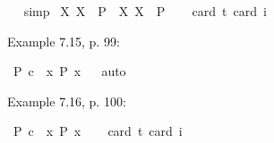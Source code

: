 \begin{isabellebody}
\ %
%
\isamarkupfalse%
\ simp%
%
%
\isanewline
{}\isamarkupfalse%
\ {\isachardoublequoteopen}{\isasymlfloor}{\isacharparenleft}{\isasymlambda}X{\isachardot}\ \isactrlbold {\isasymdiamond}\isactrlbold {\isasymexists}X{\isacharparenright}\ \ {\isacharparenleft}P{\isacharcolon}{\isacharcolon}{\isasymup}{\isasymlangle}{\isasymzero}{\isasymrangle}{\isacharparenright}\ \isactrlbold {\isasymrightarrow}\ {\isacharparenleft}{\isasymlambda}X{\isachardot}\ \isactrlbold {\isasymexists}X{\isacharparenright}\ \ P{\isasymrfloor}{\isachardoublequoteclose}\ \isanewline
\ \ \isamarkupfalse%
{\isacharbrackleft}card\ {\isacharprime}t{\isacharequal}{}{\isacharcomma}\ card\ i{\isacharequal}{}{\isacharbrackright}%
\ %
%
\isamarkupfalse%
\ %
%
%
%
%
\begin{isamarkuptext}%
Example 7.15, p. 99:%
\end{isamarkuptext}\isamarkuptrue%
\isamarkupfalse%
\ {\isachardoublequoteopen}{\isasymlfloor}\isactrlbold {\isasymbox}{\isacharparenleft}P\ {\isacharparenleft}c{\isacharcolon}{\isacharcolon}{\isasymup}{\isasymzero}{\isacharparenright}{\isacharparenright}\ \isactrlbold {\isasymrightarrow}\ {\isacharparenleft}\isactrlbold {\isasymexists}x{\isacharcolon}{\isacharcolon}{\isasymup}{\isasymzero}{\isachardot}\ \isactrlbold {\isasymbox}{\isacharparenleft}P\ x{\isacharparenright}{\isacharparenright}{\isasymrfloor}{\isachardoublequoteclose}%
\ %
%
\isamarkupfalse%
\ auto%
%
%
%
\begin{isamarkuptext}%
Example 7.16, p. 100:%
\end{isamarkuptext}\isamarkuptrue%
\isamarkupfalse%
\ {\isachardoublequoteopen}{\isasymlfloor}\isactrlbold {\isasymbox}{\isacharparenleft}P\ {\isasymdownharpoonleft}{\isacharparenleft}c{\isacharcolon}{\isacharcolon}{\isasymup}{\isasymzero}{\isacharparenright}{\isacharparenright}\ \isactrlbold {\isasymrightarrow}\ {\isacharparenleft}\isactrlbold {\isasymexists}x{\isacharcolon}{\isacharcolon}{\isasymzero}{\isachardot}\ \isactrlbold {\isasymbox}{\isacharparenleft}P\ x{\isacharparenright}{\isacharparenright}{\isasymrfloor}{\isachardoublequoteclose}\ \isanewline
\ \ \isamarkupfalse%
{\isacharbrackleft}card\ {\isacharprime}t{\isacharequal}{}{\isacharcomma}\ card\ i{\isacharequal}{}{\isacharbrackright}%
\ %
%
\isamarkupfalse%
\ %
%
%
%
%
\begin{isamarkuptext}%

\end{isamarkuptext}
\end{isabellebody}
